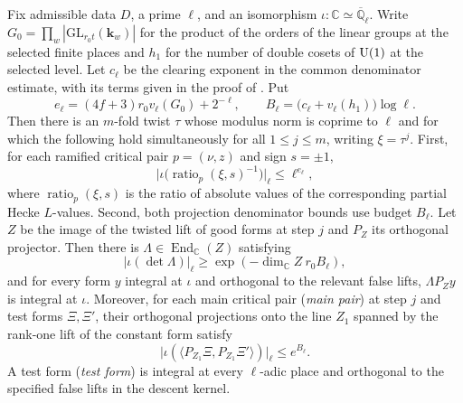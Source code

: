 \begin{lemma}
\label{lem:c-local-twist}
\emitthmsource
Fix admissible data $D$, a prime $\ell$, and an isomorphism $\iota:\mathbb C\simeq\overline{\mathbb Q}_\ell$.
Write $G_0=\prod_w|\mathrm{GL}_{r_0t}(\mathbf k_w)|$ for the product of the orders of the linear groups at the selected finite places and $h_1$ for the number of double cosets of $\operatorname{U}(1)$ at the selected level. Let $c_\ell$ be the clearing exponent in the common denominator estimate, with its terms given in the proof of . Put
\[
 e_\ell=(4f+3)r_0v_\ell(G_0)+2^{-\ell},\qquad
 B_\ell=\bigl(c_\ell+v_\ell(h_1)\bigr)\log\ell .
\]
Then there is an $m$-fold twist $\tau$ whose modulus norm is coprime to $\ell$ and for which the following hold simultaneously for all $1\le j\le m$, writing $\xi=\tau^j$. First, for each ramified critical pair $p=(\nu,z)$ and sign $s=\pm1$,
\[
 \bigl|\iota\bigl(\operatorname{ratio}_p(\xi,s)^{-1}\bigr)\bigr|_\ell
 \le \ell^{e_\ell},
\]
where $\operatorname{ratio}_p(\xi,s)$ is the ratio of absolute values of the corresponding partial Hecke $L$-values.
Second, both projection denominator bounds use budget $B_\ell$. Let $Z$ be the image of the twisted lift of good forms at step $j$ and $P_Z$ its orthogonal projector. Then there is $\Lambda\in\operatorname{End}_{\mathbb C}(Z)$ satisfying
\[
 |\iota(\det\Lambda)|_\ell\ge \exp(-\dim_{\mathbb C}Z\ r_0 B_\ell),
\]
and for every form $y$ integral at $\iota$ and orthogonal to the relevant false lifts, $\Lambda P_Z y$ is integral at $\iota$. Moreover, for each main critical pair (\emph{main pair}) at step $j$ and test forms $\Xi,\Xi'$, their orthogonal projections onto the line $Z_1$ spanned by the rank-one lift of the constant form satisfy
\[
 \bigl|\iota(\langle P_{Z_1}\Xi,P_{Z_1}\Xi'\rangle)\bigr|_\ell\le e^{B_\ell}.
\]
A test form (\emph{test form}) is integral at every $\ell$-adic place and orthogonal to the specified false lifts in the descent kernel.
\end{lemma}
